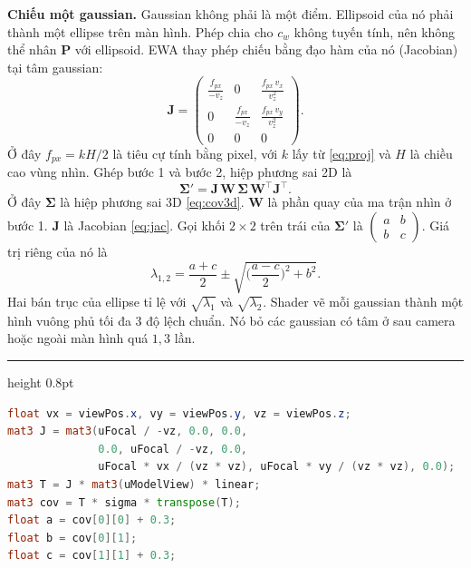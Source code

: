 \documentclass[9pt,twocolumn,a4paper]{extarticle}
\newenvironment{codebox}{\par\vspace{5pt}\noindent\begin{minipage}{\columnwidth}\hrule height 0.8pt\vspace{2pt}}{\end{minipage}\par\vspace{5pt}\noindent\ignorespaces}
\newcommand{\code}[1]{\texttt{#1}}
\newcommand{\Sig}{\symbf{\Sigma}}
\begin{document}
\textbf{Chiếu một gaussian.} Gaussian không phải là một điểm. Ellipsoid của nó phải thành một ellipse trên màn hình. Phép chia cho $c_w$ không tuyến tính, nên không thể nhân $\mathbf{P}$ với ellipsoid. EWA thay phép chiếu bằng đạo hàm của nó (Jacobian) tại tâm gaussian:
\begin{equation}
\mathbf{J}=\begin{pmatrix}
\frac{f_{px}}{-v_z}&0&\frac{f_{px}\,v_x}{v_z^{2}}\\[1mm]
0&\frac{f_{px}}{-v_z}&\frac{f_{px}\,v_y}{v_z^{2}}\\[1mm]
0&0&0
\end{pmatrix}.
\label{eq:jac}
\end{equation}
Ở đây $f_{px}=kH/2$ là tiêu cự tính bằng pixel, với $k$ lấy từ \eqref{eq:proj} và $H$ là chiều cao vùng nhìn. Ghép bước 1 và bước 2, hiệp phương sai 2D là
\begin{equation}
\Sig'=\mathbf{J}\,\mathbf{W}\,\Sig\,\mathbf{W}^{\top}\mathbf{J}^{\top}.
\label{eq:ewa}
\end{equation}
Ở đây $\Sig$ là hiệp phương sai 3D \eqref{eq:cov3d}. $\mathbf{W}$ là phần quay của ma trận nhìn ở bước 1. $\mathbf{J}$ là Jacobian \eqref{eq:jac}. Gọi khối $2\times2$ trên trái của $\Sig'$ là $\begin{pmatrix}a&b\\b&c\end{pmatrix}$. Giá trị riêng của nó là
\begin{equation}
\lambda_{1,2}=\frac{a+c}{2}\pm\sqrt{\Big(\frac{a-c}{2}\Big)^{2}+b^{2}}.
\label{eq:eig}
\end{equation}
Hai bán trục của ellipse tỉ lệ với $\sqrt{\lambda_1}$ và $\sqrt{\lambda_2}$. Shader vẽ mỗi gaussian thành một hình vuông phủ tối đa 3 độ lệch chuẩn. Nó bỏ các gaussian có tâm ở sau camera hoặc ngoài màn hình quá $1{,}3$ lần.

\begin{codebox}
\begin{lstlisting}[language=GLSL,caption={\code{render/shaders/splat\_prep.vert}: Jacobian $\mathbf{J}$ và $\Sigma'=\mathbf{J}\mathbf{W}\Sigma\mathbf{W}^{\top}\mathbf{J}^{\top}$},label={lst:ewa}]
float vx = viewPos.x, vy = viewPos.y, vz = viewPos.z;
mat3 J = mat3(uFocal / -vz, 0.0, 0.0,
              0.0, uFocal / -vz, 0.0,
              uFocal * vx / (vz * vz), uFocal * vy / (vz * vz), 0.0);
mat3 T = J * mat3(uModelView) * linear;
mat3 cov = T * sigma * transpose(T);
float a = cov[0][0] + 0.3;
float b = cov[0][1];
float c = cov[1][1] + 0.3;
\end{lstlisting}
\end{codebox}
\end{document}
